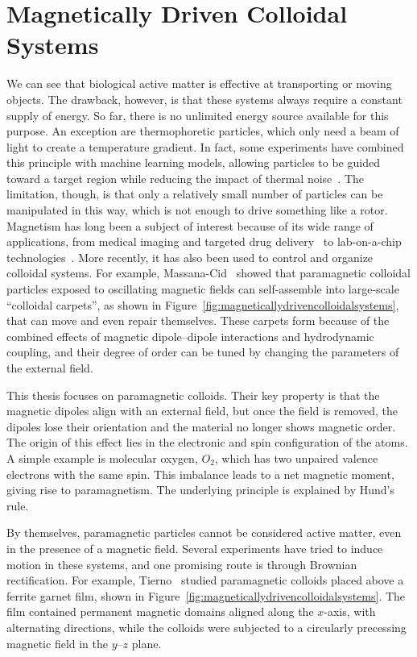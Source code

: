 \chapter{Magnetically Driven Colloidal Systems}
\label{magneticallydrivencolloidalsystems}


We can see that biological active matter is effective at transporting or moving objects. The drawback, however, is that these systems always require a constant supply of energy. So far, there is no unlimited energy source available for this purpose. An exception are thermophoretic particles, which only need a beam of light to create a temperature gradient. In fact, some experiments have combined this principle with machine learning models, allowing particles to be guided toward a target region while reducing the impact of thermal noise~\cite{muinos2021reinforcement}. The limitation, though, is that only a relatively small number of particles can be manipulated in this way, which is not enough to drive something like a rotor.
Magnetism has long been a subject of interest because of its wide range of applications, from medical imaging and targeted drug delivery~\cite{geva2006magnetic, matthews2004functional, corti2011imaging} to lab-on-a-chip technologies~\cite{pamme2006magnetism}. More recently, it has also been used to control and organize colloidal systems. For example, Massana-Cid~\cite{massana2019tunable} showed that paramagnetic colloidal particles exposed to oscillating magnetic fields can self-assemble into large-scale “colloidal carpets”, as shown in Figure~\ref{fig:magneticallydrivencolloidalsystems}, that can move and even repair themselves. These carpets form because of the combined effects of magnetic dipole–dipole interactions and hydrodynamic coupling, and their degree of order can be tuned by changing the parameters of the external field.

This thesis focuses on paramagnetic colloids. Their key property is that the magnetic dipoles align with an external field, but once the field is removed, the dipoles lose their orientation and the material no longer shows magnetic order. The origin of this effect lies in the electronic and spin configuration of the atoms. A simple example is molecular oxygen, $O_2$, which has two unpaired valence electrons with the same spin. This imbalance leads to a net magnetic moment, giving rise to paramagnetism. The underlying principle is explained by Hund’s rule.

By themselves, paramagnetic particles cannot be considered active matter, even in the presence of a magnetic field. Several experiments have tried to induce motion in these systems, and one promising route is through Brownian rectification. For example, Tierno~\cite{tierno2012depinning} studied paramagnetic colloids placed above a ferrite garnet film, shown in Figure~\ref{fig:magneticallydrivencolloidalsystems}. The film contained permanent magnetic domains aligned along the $x$-axis, with alternating directions, while the colloids were subjected to a circularly precessing magnetic field in the $y$–$z$ plane.

